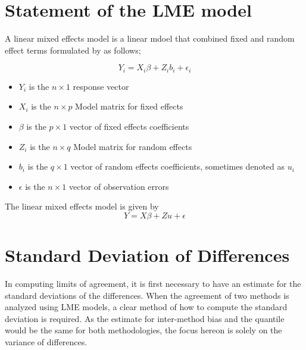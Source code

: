 \documentclass[MAIN.tex]{subfiles}
\begin{document}
%	
%	
\section{Statement of the LME model}
A linear mixed effects model is a linear mdoel that combined fixed and random effect terms formulated by \citet{LW82} as follows;

\begin{displaymath}
Y_{i} =X_{i}\beta + Z_{i}b_{i} + \epsilon_{i}
\end{displaymath}
\begin{itemize}
	
	\item $Y_{i}$ is the $n \times 1$ response vector \item $X_{i}$ is
	the $n \times p$ Model matrix for fixed effects \item $\beta$ is
	the $p \times 1$ vector of fixed effects coefficients \item
	$Z_{i}$ is the $n \times q$ Model matrix for random effects \item
	$b_{i}$ is the $q \times 1$ vector of random effects coefficients,
	sometimes denoted as $u_{i}$ \item $\epsilon$ is the $n \times 1$
	vector of observation errors
\end{itemize}


The linear mixed effects model is given by
\begin{equation}
Y = X\beta + Zu + \epsilon
\end{equation}
\section{Standard Deviation of Differences}
In computing limits of agreement, it is first necessary to have an estimate for the standard deviations of the differences. When the agreement of two methods is analyzed using LME models, a clear method of how to compute the standard deviation is required. As the estimate for inter-method bias and the quantile would be the same for both methodologies, the focus hereon is solely on the variance of differences.
\end{document}
